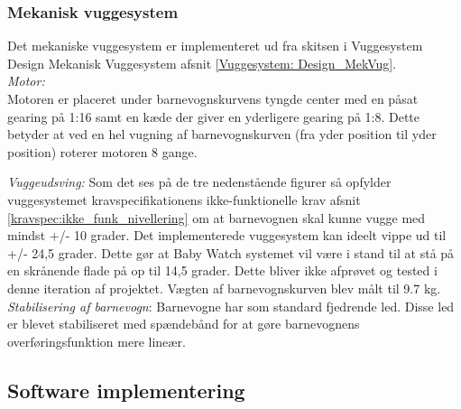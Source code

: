 \subsubsection{Mekanisk vuggesystem}
\label{Vuggesystem: Implementering_MV} 
Det mekaniske vuggesystem er implementeret ud fra skitsen i Vuggesystem Design Mekanisk Vuggesystem afsnit \vref{Vuggesystem: Design_MekVug}. \\
\textit{Motor:}\\
Motoren er placeret under barnevognskurvens tyngde center med en påsat gearing på 1:16 samt en kæde der giver en yderligere gearing på 1:8. Dette betyder at ved en hel vugning af barnevognskurven (fra yder position til yder position) roterer motoren 8 gange.

\textit{Vuggeudsving:}
Som det ses på de tre nedenstående figurer så opfylder vuggesystemet kravspecifikationens ikke-funktionelle krav afsnit \ref{kravspec:ikke_funk_nivellering} om at barnevognen skal kunne vugge med mindst +/- 10 grader. Det implementerede vuggesystem  kan ideelt vippe ud til +/- 24,5 grader. Dette gør at Baby Watch systemet vil være i stand til at stå på en skrånende flade på op til 14,5 grader. Dette bliver ikke afprøvet og tested i denne iteration af projektet. Vægten af barnevognskurven blev målt til 9.7 kg.
\textit{Stabilisering af barnevogn}:
Barnevogne har som standard fjedrende led. Disse led er blevet stabiliseret med spændebånd for at gøre barnevognens overføringsfunktion mere lineær. 

\newpage
\subsection{Software implementering}
